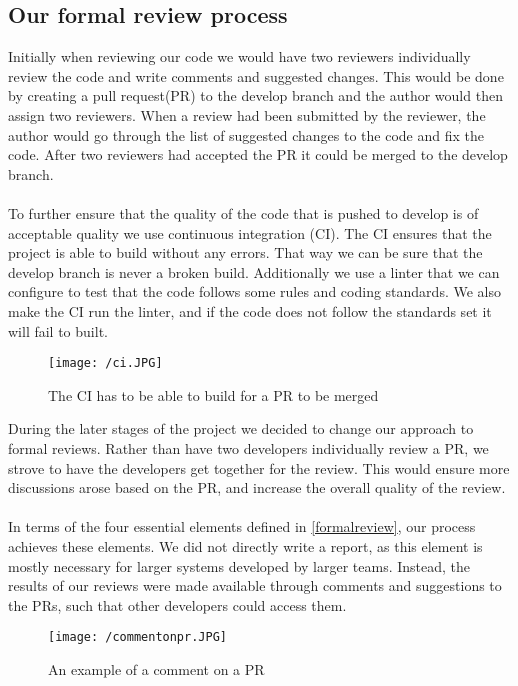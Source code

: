 \subsection{Our formal review process}
Initially when reviewing our code we would have two reviewers individually review the code and write comments and suggested changes. 
This would be done by creating a pull request(PR) to the develop branch and the author would then assign two reviewers. 
When a review had been submitted by the reviewer, the author would go through the list of suggested changes to the code and fix the code.
After two reviewers had accepted the PR it could be merged to the develop branch. 
\\\\
To further ensure that the quality of the code that is pushed to develop is of acceptable quality we use continuous integration (CI).
The CI ensures that the project is able to build without any errors. 
That way we can be sure that the develop branch is never a broken build.
Additionally we use a linter that we can configure to test that the code follows some rules and coding standards. 
We also make the CI run the linter, and if the code does not follow the standards set it will fail to built.
\begin{figure}[H]
    \texttt{[image: /ci.JPG]}
    \caption{The CI has to be able to build for a PR to be merged}
    \label{fig:continous-integration}
\end{figure}
\noindent
During the later stages of the project we decided to change our approach to formal reviews.
Rather than have two developers individually review a PR, we strove to have the developers get together for the review.
This would ensure more discussions arose based on the PR, and increase the overall quality of the review.
\\\\
In terms of the four essential elements defined in \autoref{formalreview}, our process achieves these elements.
We did not directly write a report, as this element is mostly necessary for larger systems developed by larger teams.
Instead, the results of our reviews were made available through comments and suggestions to the PRs, such that other developers could access them.
\begin{figure}[H]
    \texttt{[image: /commentonpr.JPG]}
    \caption{An example of a comment on a PR}
    \label{fig:comment-on-pr}
\end{figure}